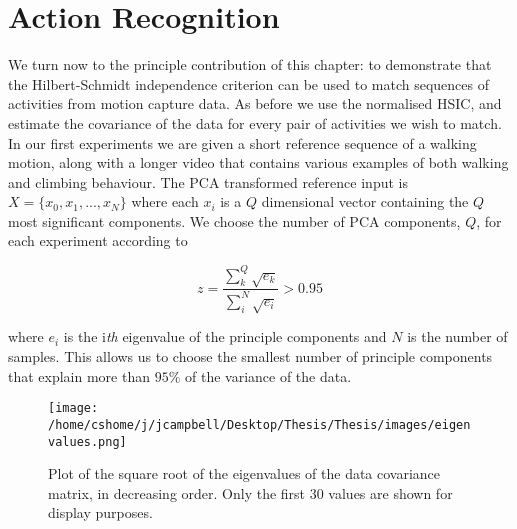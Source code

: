 \section{Action Recognition}

We turn now to the principle contribution of this chapter: to demonstrate that the Hilbert-Schmidt independence criterion can be used to match sequences of activities from motion capture data. As before we use the normalised HSIC, and estimate the covariance of the data for every pair of activities we wish to match. \\%

In our first experiments we are given a short reference sequence of a walking motion, along with a longer video that contains various examples of both walking and climbing behaviour. The PCA transformed reference input is $X = \{x_0, x_1, ..., x_N\}$ where each $x_i$ is a $Q$ dimensional vector containing the $Q$ most significant components. We choose the number of PCA components, $Q$, for each experiment according to 

\begin{equation}
z = \frac{\sum_k^Q{\sqrt{e_k}}}{\sum_i^N{\sqrt{e_i}}} > 0.95
\end{equation}

\noindent where $e_i$ is the i\textit{th} eigenvalue of the principle components and $N$ is the number of samples. This allows us to choose the smallest number of principle components that explain more than $95\%$ of the variance of the data.\\

\begin{figure}[h]
\texttt{[image: /home/cshome/j/jcampbell/Desktop/Thesis/Thesis/images/eigenvalues.png]}
\caption{Plot of the square root of the eigenvalues of the data covariance matrix, in decreasing order. Only the first 30 values are shown for display purposes. \label{eigenvalues}}
\end{figure}

